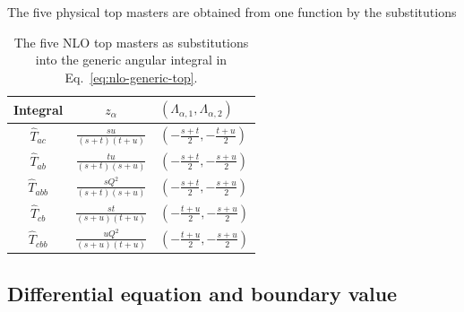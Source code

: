 The five physical top masters are obtained from one function by the
substitutions
\begin{table}[htbp]
\centering
\small
\begin{tabular}{@{}ccl@{}}
\toprule
Integral & $z_\alpha$ & $(\Lambda_{\alpha,1},\Lambda_{\alpha,2})$\\
\midrule
$\widehat T_{ac}$
& $\displaystyle\frac{su}{(s+t)(t+u)}$
& $\displaystyle\left(-\frac{s+t}{2},-\frac{t+u}{2}\right)$\\[2mm]
$\widehat T_{ab}$
& $\displaystyle\frac{tu}{(s+t)(s+u)}$
& $\displaystyle\left(-\frac{s+t}{2},-\frac{s+u}{2}\right)$\\[2mm]
$\widehat T_{abb}$
& $\displaystyle\frac{sQ^2}{(s+t)(s+u)}$
& $\displaystyle\left(-\frac{s+t}{2},-\frac{s+u}{2}\right)$\\[2mm]
$\widehat T_{cb}$
& $\displaystyle\frac{st}{(s+u)(t+u)}$
& $\displaystyle\left(-\frac{t+u}{2},-\frac{s+u}{2}\right)$\\[2mm]
$\widehat T_{cbb}$
& $\displaystyle\frac{uQ^2}{(s+u)(t+u)}$
& $\displaystyle\left(-\frac{t+u}{2},-\frac{s+u}{2}\right)$\\
\bottomrule
\end{tabular}
\caption{The five NLO top masters as substitutions into the generic angular
integral in Eq.~\eqref{eq:nlo-generic-top}.}
\label{tab:nlo-top-maps}
\end{table}

\subsection{Differential equation and boundary value}

